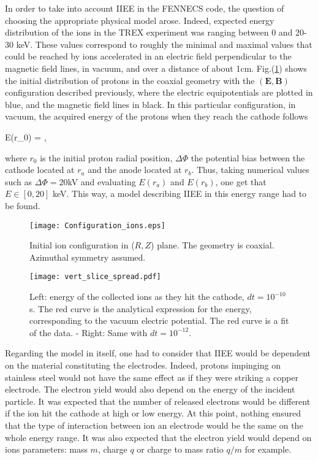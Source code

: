 In order to take into account IIEE in the FENNECS code, the question of choosing the appropriate physical model arose. Indeed, expected energy distribution of the ions in the TREX experiment was ranging between 0 and 20-30 keV. These values correspond to roughly the minimal and maximal values that could be reached by ions accelerated in an electric field perpendicular to the magnetic field lines, in vacuum, and over a distance of about 1cm. Fig.(\ref{Config_ions}) shows the initial distribution of protons in the coaxial geometry with the $(\mathbf{E}, \mathbf{B})$ configuration described previously, where the electric equipotentials are plotted in blue, and the magnetic field lines in black. In this particular configuration, in vacuum, the acquired energy of the protons when they reach the cathode follows 

\beq
E(r_0) = \Delta \Phi {},\label{ions_energy}      
\eeq
 
\noindent where $r_0$ is the initial proton radial position, $\Delta \Phi$ the potential bias between the cathode located at $r_a$ and the anode located at $r_b$. Thus, taking numerical values such as $\Delta \Phi = 20$kV and evaluating $E(r_a)$ and $E(r_b)$, one get that $E\in [0,20]$ keV. This way, a model describing IIEE in this energy range had to be found.\\


\begin{figure}[h!]
\centering
	\texttt{[image: Configuration\_ions.eps]}
	\caption{\label{Config_ions} Initial ion configuration in ($R,Z$) plane. The geometry is coaxial. Azimuthal symmetry assumed.}
\end{figure}



\begin{figure}[h!]
\centering
	\texttt{[image: vert\_slice\_spread.pdf]}
	\caption{\label{vert_spread} Left: energy of the collected ions as they hit the cathode, $dt=10^{-10}$ s. The red curve is the analytical expression for the energy, corresponding to the vacuum electric potential. The red curve is a fit of the data. - Right: Same with $dt=10^{-12}$. }
\end{figure}  



\noindent Regarding the model in itself, one had to consider that IIEE would be dependent on the material constituting the electrodes. Indeed, protons impinging on stainless steel would not have the same effect as if they were striking a copper electrode. The electron yield would also depend on the energy of the incident particle. It was expected that the number of released electrons would be different if the ion hit the cathode at high or low energy. At this point, nothing ensured that the type of interaction between ion an electrode would be the same on the whole energy range. It was also expected that the electron yield would depend on ions parameters: mass $m$, charge $q$ or charge to mass ratio $q/m$ for example.\\

